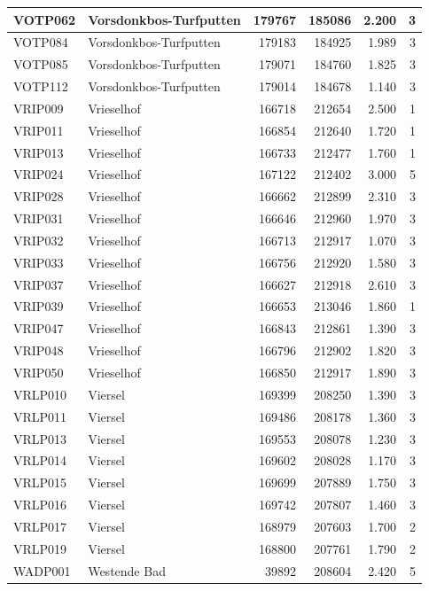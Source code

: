 \documentclass[11pt,]{book}
\begin{document}
\begin{table}
\begin{tabular}[t]{l|l|r|r|r|r}
\hline
VOTP062 & Vorsdonkbos-Turfputten & 179767 & 185086 & 2.200 & 3\\
\hline
VOTP084 & Vorsdonkbos-Turfputten & 179183 & 184925 & 1.989 & 3\\
\hline
VOTP085 & Vorsdonkbos-Turfputten & 179071 & 184760 & 1.825 & 3\\
\hline
VOTP112 & Vorsdonkbos-Turfputten & 179014 & 184678 & 1.140 & 3\\
\hline
VRIP009 & Vrieselhof & 166718 & 212654 & 2.500 & 1\\
\hline
VRIP011 & Vrieselhof & 166854 & 212640 & 1.720 & 1\\
\hline
VRIP013 & Vrieselhof & 166733 & 212477 & 1.760 & 1\\
\hline
VRIP024 & Vrieselhof & 167122 & 212402 & 3.000 & 5\\
\hline
VRIP028 & Vrieselhof & 166662 & 212899 & 2.310 & 3\\
\hline
VRIP031 & Vrieselhof & 166646 & 212960 & 1.970 & 3\\
\hline
VRIP032 & Vrieselhof & 166713 & 212917 & 1.070 & 3\\
\hline
VRIP033 & Vrieselhof & 166756 & 212920 & 1.580 & 3\\
\hline
VRIP037 & Vrieselhof & 166627 & 212918 & 2.610 & 3\\
\hline
VRIP039 & Vrieselhof & 166653 & 213046 & 1.860 & 1\\
\hline
VRIP047 & Vrieselhof & 166843 & 212861 & 1.390 & 3\\
\hline
VRIP048 & Vrieselhof & 166796 & 212902 & 1.820 & 3\\
\hline
VRIP050 & Vrieselhof & 166850 & 212917 & 1.890 & 3\\
\hline
VRLP010 & Viersel & 169399 & 208250 & 1.390 & 3\\
\hline
VRLP011 & Viersel & 169486 & 208178 & 1.360 & 3\\
\hline
VRLP013 & Viersel & 169553 & 208078 & 1.230 & 3\\
\hline
VRLP014 & Viersel & 169602 & 208028 & 1.170 & 3\\
\hline
VRLP015 & Viersel & 169699 & 207889 & 1.750 & 3\\
\hline
VRLP016 & Viersel & 169742 & 207807 & 1.460 & 3\\
\hline
VRLP017 & Viersel & 168979 & 207603 & 1.700 & 2\\
\hline
VRLP019 & Viersel & 168800 & 207761 & 1.790 & 2\\
\hline
WADP001 & Westende Bad & 39892 & 208604 & 2.420 & 5\\

\end{tabular}
\end{table}
\end{document}
